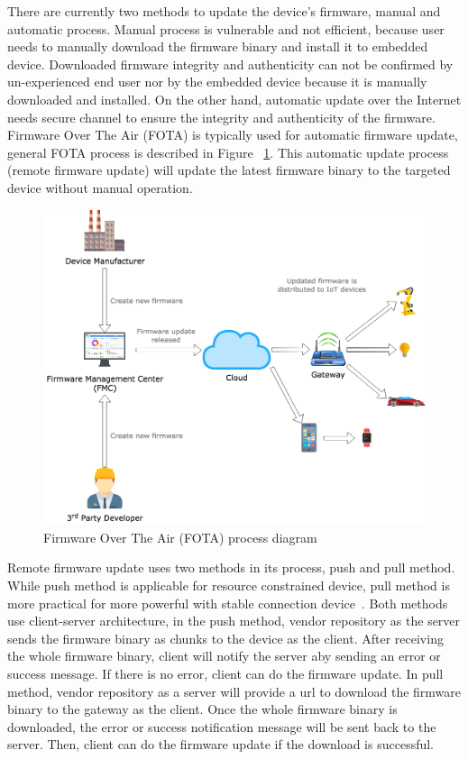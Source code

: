 There are currently two methods to update the device's firmware, manual and automatic process. Manual process is vulnerable and not efficient, because user needs to manually download the firmware binary and install it to embedded device. Downloaded firmware integrity and authenticity can not be confirmed by un-experienced end user nor by the embedded device because it is manually downloaded and installed. On the other hand, automatic update over the Internet needs secure channel to ensure the integrity and authenticity of the firmware. Firmware Over The Air (FOTA) is typically used for automatic firmware update, general FOTA process is described in Figure ~\ref{fig:1_fota}. This automatic update process (remote firmware update) will update the latest firmware binary to the targeted device without manual operation.

\begin{figure}[H]
	\begin{center}
		\includegraphics[width=1.0\textwidth]{figures/img_firmware_update_fota.png}
		\caption{Firmware Over The Air (FOTA) process diagram} 
		\label{fig:1_fota}
	\end{center}
\end{figure}

Remote firmware update uses two methods in its process, push and pull method. While push method is applicable for resource constrained device, pull method is more practical for more powerful with stable connection device~\cite{securefota}. Both methods use client-server architecture, in the push method, vendor repository as the server sends the firmware binary as chunks to the device as the client. After receiving the whole firmware binary, client will notify the server aby sending an error or success message. If there is no error, client can do the firmware update. In pull method, vendor repository as a server will provide a url to download the firmware binary to the gateway as the client. Once the whole firmware binary is downloaded, the error or success notification message will be sent back to the server. Then, client can do the firmware update if the download is successful.


